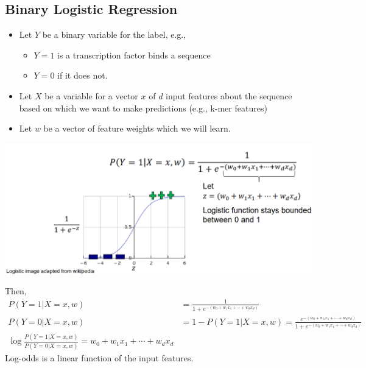 \documentclass[10pt]{article}
\begin{document}
\subsection*{Binary Logistic Regression}
\begin{itemize}
    \item Let $Y$ be a binary variable for the label, e.g.,
    \begin{itemize}
        \item $Y = 1$ is a transcription factor binds a sequence
        \item $Y = 0$ if it does not.
    \end{itemize}
    \item Let $X$ be a variable for a vector $x$ of $d$ input features about the sequence based on which we want to make predictions (e.g., k-mer features)
    \item Let $w$ be a vector of feature weights which we will learn.
\end{itemize}
\begin{center} 
	\includegraphics*[width=\textwidth]{W8_10.png} 
\end{center}
Then, 
\begin{align*}
    P(Y = 1|X = x, w) &= \frac{1}{1 + e^{-(w_0 + w_1 x_1 + \cdots + w_d x_d)}}\\
    P(Y = 0|X = x, w) &= 1 - P(Y = 1|X = x, w) = \frac{e^{-(w_0 + w_1 x_1 + \cdots + w_d x_d)}}{1 + e^{-(w_0 + w_1 x_1 + \cdots + w_d x_d)}}\\
    \log \frac{P(Y = 1|X = x, w)}{P(Y = 0|X = x, w)} = w_0 + w_1 x_1 + \cdots + w_d x_d
\end{align*}
Log-odds is a linear function of the input features.
\end{document}
